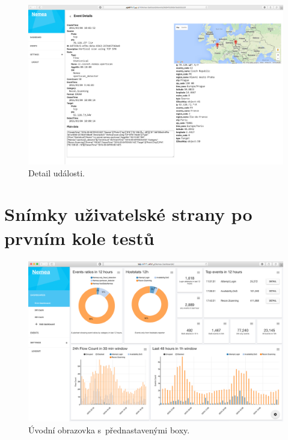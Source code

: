 \begin{figure}[ht]
    \centering
    \includegraphics[width=1\textwidth]{fig/screen_before_3.png}
    \caption{Detail události.} \label{screen:before:3}
\end{figure}



\chapter{Snímky uživatelské strany po prvním kole testů}
\label{screens:after}

\begin{figure}[ht]
    \centering
    \includegraphics[width=1\textwidth]{fig/screen_after_1.png}
    \caption{Úvodní obrazovka s~přednastavenými boxy.} \label{screen:after:1}
\end{figure}

